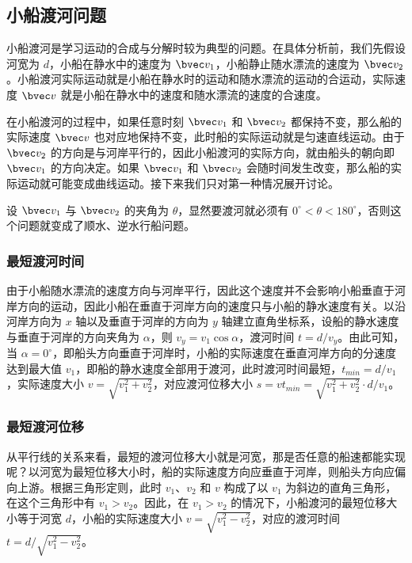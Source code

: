 \subsection{小船渡河问题}

小船渡河是学习运动的合成与分解时较为典型的问题。在具体分析前，我们先假设河宽为 $d$，小船在静水中的速度为 $\bvec v_1$，小船静止随水漂流的速度为 $\bvec v_2$。小船渡河实际运动就是小船在静水时的运动和随水漂流的运动的合运动，实际速度 $\bvec v$ 就是小船在静水中的速度和随水漂流的速度的合速度。

在小船渡河的过程中，如果任意时刻 $\bvec v_1$ 和 $\bvec v_2$ 都保持不变，那么船的实际速度 $\bvec v$ 也对应地保持不变，此时船的实际运动就是匀速直线运动。由于 $\bvec v_2$ 的方向是与河岸平行的，因此小船渡河的实际方向，就由船头的朝向即 $\bvec v_1$ 的方向决定。如果 $\bvec v_1$ 和 $\bvec v_2$ 会随时间发生改变，那么船的实际运动就可能变成曲线运动。接下来我们只对第一种情况展开讨论。

设 $\bvec v_1$ 与 $\bvec v_2$ 的夹角为 $\theta$，显然要渡河就必须有 $0^\circ < \theta < 180^\circ $，否则这个问题就变成了顺水、逆水行船问题。

\subsubsection{最短渡河时间}

由于小船随水漂流的速度方向与河岸平行，因此这个速度并不会影响小船垂直于河岸方向的运动，因此小船在垂直于河岸方向的速度只与小船的静水速度有关。以沿河岸方向为 $x$ 轴以及垂直于河岸的方向为 $y$ 轴建立直角坐标系，设船的静水速度与垂直于河岸的方向夹角为 $\alpha$，则 $v_y = v_1 \cos \alpha$，渡河时间 $t=d/v_y$。由此可知，当 $\alpha = 0^\circ$，即船头方向垂直于河岸时，小船的实际速度在垂直河岸方向的分速度达到最大值 $v_1$，即船的静水速度全部用于渡河，此时渡河时间最短，$t_{min}=d/v_1$，实际速度大小 $v=\sqrt{v_1^2+v_2^2}$，对应渡河位移大小 $s=vt_{min}=\sqrt{v_1^2+v_2^2}\cdot d/v_1$。

\subsubsection{最短渡河位移}

从平行线的关系来看，最短的渡河位移大小就是河宽，那是否任意的船速都能实现呢？以河宽为最短位移大小时，船的实际速度方向应垂直于河岸，则船头方向应偏向上游。根据三角形定则，此时 $v_1$、$v_2$ 和 $v$ 构成了以 $v_1$ 为斜边的直角三角形，在这个三角形中有 $v_1>v_2$。因此，在 $v_1>v_2$ 的情况下，小船渡河的最短位移大小等于河宽 $d$，小船的实际速度大小 $v=\sqrt{v_1^2-v_2^2}$，对应的渡河时间 $t=d/\sqrt{v_1^2-v_2^2}$。

